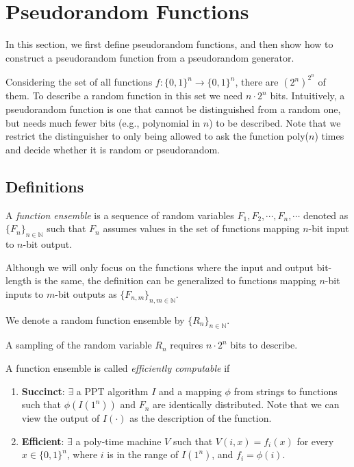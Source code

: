 \section{Pseudorandom Functions}
In this section, we first define pseudorandom functions, and then show how to  construct a pseudorandom function from a pseudorandom generator.

Considering the set of all functions $f: \{0, 1\}^n \rightarrow \{0, 1\}^n$, there are $(2^n)^{2^n}$ of them.
To describe a random function in this set we need $n \cdot 2^n$ bits.
Intuitively, a pseudorandom function is one that cannot be distinguished from a random one,
but needs much fewer bits (e.g., polynomial in $n$) to be described.
Note that we restrict the distinguisher to only being allowed to ask the function poly($n$) times and decide whether it is random or pseudorandom.

\subsection{Definitions}

\begin{definition}
    A \emph{function ensemble} is a sequence of random variables $F_1, F_2, \cdots, F_n, \cdots$ denoted as $\{F_n\}_{n \in \mathbb{N}}$ such that
    $F_n$ assumes values in the set of functions mapping $n$-bit input to $n$-bit output.
\end{definition}
Although we will only focus on the functions where the input and output bit-length is the same, the definition can be generalized to functions mapping $n$-bit inputs to $m$-bit outputs as $\{F_{n, m}\}_{n, m \in \mathbb{N}}$.

\begin{definition}
    We denote a random function ensemble by $\{R_n\}_{n \in \mathbb{N}}$.
\end{definition}
A sampling of the random variable $R_n$ requires $n \cdot 2^n$ bits to describe.

\begin{definition}
    A function ensemble is called \emph{efficiently computable} if
    \begin{enumerate}[label=(\alph*)]
        \item \textbf{Succinct}:
              $\exists$ a PPT algorithm $I$ and a mapping $\phi$ from strings to functions such that
              $\phi(I(1^n))$ and $F_n$ are identically distributed.
              Note that we can view the output of $I(\cdot)$ as the description of the function.
        \item \textbf{Efficient}:
              $\exists$ a poly-time machine $V$ such that
              $V(i, x) = f_i(x)$ for every $x \in \{0, 1\}^n$, where $i$ is in the range of $I(1^n)$, and $f_i = \phi(i)$.
    \end{enumerate}
\end{definition}

